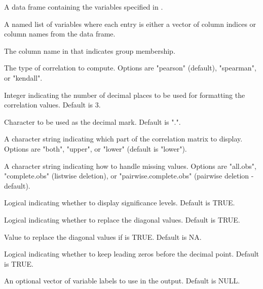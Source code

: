 \documentclass[a4paper]{book}
\begin{document}
%
\begin{Arguments}
\begin{ldescription}
\item[\code{data}] A data frame containing the variables specified in .

\item[\code{var\_list}] A named list of variables where each entry is either a vector of
column indices or column names from the  data frame.

\item[\code{groupid}] The column name in  that indicates group membership.

\item[\code{type}] The type of correlation to compute. Options are
"pearson" (default), "spearman", or "kendall".

\item[\code{digits}] Integer indicating the number of decimal places to be used for
formatting the correlation values. Default is 3.

\item[\code{decimal.mark}] Character to be used as the decimal mark. Default is ".".

\item[\code{triangle}] A character string indicating which part of the correlation
matrix to display. Options are "both", "upper", or "lower" (default is "lower").

\item[\code{use}] A character string indicating how to handle missing values.
Options are "all.obs", "complete.obs" (listwise deletion), or
"pairwise.complete.obs" (pairwise deletion - default).

\item[\code{show\_significance}] Logical indicating whether to display
significance levels. Default is TRUE.

\item[\code{replace\_diagonal}] Logical indicating whether to replace the
diagonal values. Default is TRUE.

\item[\code{replacement}] Value to replace the diagonal values if
 is TRUE. Default is NA.

\item[\code{lead.decimal}] Logical indicating whether to keep leading zeros
before the decimal point. Default is TRUE.

\item[\code{var\_labels}] An optional vector of variable labels to use in the output.
Default is NULL.


\end{ldescription}
\end{Arguments}
\end{document}
